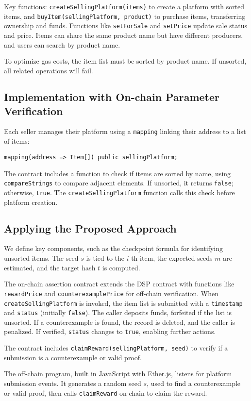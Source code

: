 \documentclass[runningheads]{llncs}
\begin{document}
Key functions: \texttt{createSellingPlatform(items)} to create a platform with sorted items, and \texttt{buyItem(sellingPlatform, product)} to purchase items, transferring ownership and funds. Functions like \texttt{setForSale} and \texttt{setPrice} update sale status and price. Items can share the same product name but have different producers, and users can search by product name.

To optimize gas costs, the item list must be sorted by product name. If unsorted, all related operations will fail.
\subsection{Implementation with On-chain Parameter Verification}
Each seller manages their platform using a \texttt{mapping} linking their address to a list of items:
\begin{lstlisting}[numbers=none]
mapping(address => Item[]) public sellingPlatform;
\end{lstlisting}
The contract includes a function to check if items are sorted by name, using \texttt{compareStrings} to compare adjacent elements. If unsorted, it returns \texttt{false}; otherwise, \texttt{true}. The \texttt{createSellingPlatform} function calls this check before platform creation.
\subsection{Applying the Proposed Approach}
We define key components, such as the checkpoint formula for identifying unsorted items. The seed \( s \) is tied to the \( i \)-th item, the expected seeds \( m \) are estimated, and the target hash \( t \) is computed.

The on-chain assertion contract extends the DSP contract with functions like \texttt{rewardPrice} and \texttt{counterexamplePrice} for off-chain verification. When \texttt{createSellingPlatform} is invoked, the item list is submitted with a \texttt{timestamp} and \texttt{status} (initially \texttt{false}). The caller deposits funds, forfeited if the list is unsorted. If a counterexample is found, the record is deleted, and the caller is penalized. If verified, \texttt{status} changes to \texttt{true}, enabling further actions.

The contract includes \texttt{claimReward(sellingPlatform, seed)} to verify if a submission is a counterexample or valid proof.

The off-chain program, built in JavaScript with Ether.js, listens for platform submission events. It generates a random seed \( s \), used to find a counterexample or valid proof, then calls \texttt{claimReward} on-chain to claim the reward.
\end{document}
